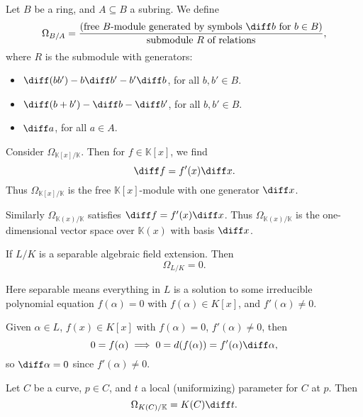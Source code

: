 \documentclass[12pt]{article}
\begin{document}
\begin{definition}
	Let $B$ be a ring, and $A \subseteq B$ a subring. We define
	\[
		\Omega_{B/A} = \frac{(\text{free $B$-module generated by symbols $\diff b$ for $b \in B$})}{\text{submodule $R$ of relations}},
	\]
	where $R$ is the submodule with generators:
	\begin{itemize}
		\item $\diff (b b') - b \diff b' - b' \diff b$, for all $b, b' \in B$.
		\item $\diff (b + b') - \diff b - \diff b'$, for all $b, b' \in B$.
		\item $\diff a$, for all $a \in A$.
	\end{itemize}
	
\end{definition}


\begin{exbox}
	Consider $\Omega_{\mathbb{K}[x]/\mathbb{K}}$. Then for $f \in \mathbb{K}[x]$, we find
	\[
	\diff f = f'(x) \diff x.
	\]
	Thus $\Omega_{\mathbb{K}[x]/\mathbb{K}}$ is the free $\mathbb{K}[x]$-module with one generator $\diff x$.

	Similarly $\Omega_{\mathbb{K}(x)/\mathbb{K}}$ satisfies $\diff f = f'(x) \diff x$. Thus $\Omega_{\mathbb{K}(x)/\mathbb{K}}$ is the one-dimensional vector space over $\mathbb{K}(x)$ with basis $\diff x$.
\end{exbox}

\begin{proposition}
	If $L/K$ is a separable algebraic field extension. Then
	\[
	\Omega_{L/K} = 0.
	\]
\end{proposition}

Here separable means everything in $L$ is a solution to some irreducible polynomial equation $f(\alpha) = 0$ with $f(\alpha) \in K[x]$, and $f'(\alpha) \neq 0$.

\begin{proofbox}
	Given $\alpha \in L$, $f(x) \in K[x]$ with $f(\alpha) = 0$, $f'(\alpha) \neq 0$, then
	\[
	0 = f(\alpha) \implies 0 = d(f(\alpha)) = f'(\alpha) \diff \alpha,
	\]
	so $\diff \alpha = 0$ since $f'(\alpha) \neq 0$.
\end{proofbox}

\begin{lemma}
	Let $C$ be a curve, $p \in C$, and $t$ a local (uniformizing) parameter for $C$ at $p$. Then
	\[
	\Omega_{K(C)/\mathbb{K}} = K(C) \diff t.
	\]
\end{lemma}
\end{document}
